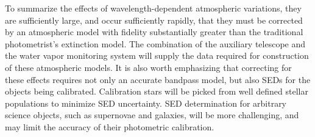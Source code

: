 \documentclass[12pt,preprint]{aastex}
\begin{document}
To summarize the effects of wavelength-dependent atmospheric variations, they are sufficiently large, and occur sufficiently rapidly, that they must be corrected by an atmospheric model with fidelity substantially greater than the traditional photometrist's extinction model.   The combination of the auxiliary telescope and the water vapor monitoring system will supply the data required for construction of these atmospheric models.  It is also worth emphasizing that correcting for these effects requires not only an accurate bandpass model, but also SEDs for the objects being calibrated.   Calibration stars will be picked from well defined stellar populations to minimize SED uncertainty.   SED determination for arbitrary science objects, such as supernovae and galaxies, will be more challenging, and may limit the accuracy of their photometric calibration.

\begin{figure}[htbp]
\centering
{}
\end{figure}
\end{document}
